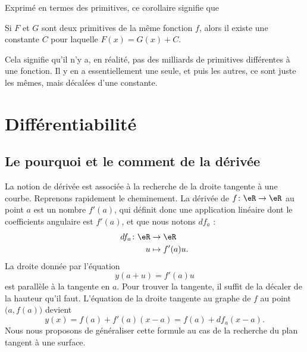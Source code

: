 Exprimé en termes des primitives, ce corollaire signifie que
\begin{corollary}[bis]  \label{CorZeroCst}
    Si $F$ et $G$ sont deux primitives de la même fonction $f$, alors il existe une constante $C$ pour laquelle $F(x)=G(x)+C$.
\end{corollary}
Cela signifie qu'il n'y a, en réalité, pas des milliards de primitives différentes à une fonction. Il y en a essentiellement une seule, et puis les autres, ce sont juste les mêmes, mais décalées d'une constante.




                    \section{Différentiabilité}

                    \subsection{Le pourquoi et le comment de la dérivée}

La notion de dérivée est associée à la recherche de la droite tangente à une courbe. Reprenons rapidement le cheminement. La dérivée de $f\colon \eR\to \eR$ au point $a$ est un nombre $f'(a)$, qui définit donc une application linéaire dont le coefficients angulaire est $f'(a)$, et que nous notons $df_a$ :
\begin{equation}
    \begin{aligned}
        df_a\colon \eR&\to \eR \\
        u&\mapsto f'(a)u. 
    \end{aligned}
\end{equation}
La droite donnée par l'équation
\begin{equation}
    y(a+u)=f'(a)u
\end{equation}
est parallèle à la tangente en $a$. Pour trouver la tangente, il suffit de la décaler de la hauteur qu'il faut. L'équation de la droite tangente au graphe de $f$ au point $\big( a,f(a) \big)$ devient
\begin{equation}        \label{EqDiffRapTgDer}
    y(x)=f(a)+f'(a)(x-a)=f(a)+df_a(x-a).
\end{equation}
Nous nous proposons de généraliser cette formule au cas de la recherche du plan tangent à une surface.
 
